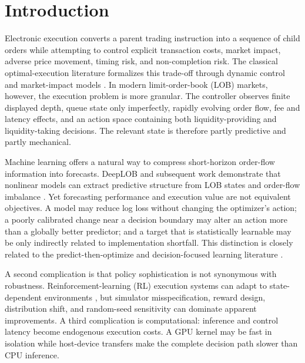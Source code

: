 \documentclass[journal,10pt]{IEEEtran}
\newcommand{\1}{\mathbf{1}}
\begin{document}
\section{Introduction}
\label{sec:intro}
Electronic execution converts a parent trading instruction into a sequence of child orders while attempting to control explicit transaction costs, market impact, adverse price movement, timing risk, and non-completion risk. The classical optimal-execution literature formalizes this trade-off through dynamic control and market-impact models \cite{BertsimasLo1998,AlmgrenChriss2001,ObizhaevaWang2013,AlfonsiFruthSchied2010,Gatheral2010}. In modern limit-order-book (LOB) markets, however, the execution problem is more granular. The controller observes finite displayed depth, queue state only imperfectly, rapidly evolving order flow, fee and latency effects, and an action space containing both liquidity-providing and liquidity-taking decisions. The relevant state is therefore partly predictive and partly mechanical.

Machine learning offers a natural way to compress short-horizon order-flow information into forecasts. DeepLOB and subsequent work demonstrate that nonlinear models can extract predictive structure from LOB states and order-flow imbalance \cite{ZhangZohrenRoberts2019,SirignanoCont2019,KolmTurielWestray2023,BriolaBartolucciAste2025}. Yet forecasting performance and execution value are not equivalent objectives. A model may reduce log loss without changing the optimizer's action; a poorly calibrated change near a decision boundary may alter an action more than a globally better predictor; and a target that is statistically learnable may be only indirectly related to implementation shortfall. This distinction is closely related to the predict-then-optimize and decision-focused learning literature \cite{ElmachtoubGrigas2022,DontiAmosKolter2017,WilderDilkinaTambe2019}.

A second complication is that policy sophistication is not synonymous with robustness. Reinforcement-learning (RL) execution systems can adapt to state-dependent environments \cite{NevmyvakaFengKearns2006,ZhangDuanChen2023,WangGaoLi2026,CheriditoWeiss2026}, but simulator misspecification, reward design, distribution shift, and random-seed sensitivity can dominate apparent improvements. A third complication is computational: inference and control latency become endogenous execution costs. A GPU kernel may be fast in isolation while host-device transfers make the complete decision path slower than CPU inference.
\end{document}
